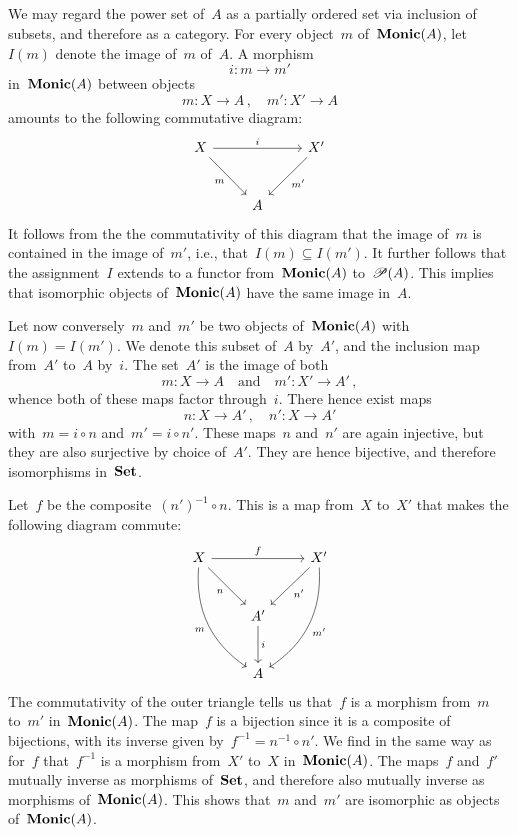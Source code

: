 \subsection{}



\subsubsection{}

We may regard the power set of~$A$ as a partially ordered set via inclusion of subsets, and therefore as a category.
For every object~$m$ of~$\mathbf{Monic}(A)$, let $I(m)$ denote the image of~$m$ of~$A$.
A morphism
\[
	i \colon m \to m'
\]
in~$\mathbf{Monic}(A)$ between objects
\[
	m \colon X \to A \,,
	\quad
	m' \colon X' \to A
\]
amounts to the following commutative diagram:
\[
	\begin{tikzcd}[row sep = large]
		X
		\arrow{rr}[above]{i}
		\arrow{dr}[below left]{m}
		&
		{}
		&
		X'
		\arrow{dl}[below right]{m'}
		\\
		{}
		&
		A
		&
		{}
	\end{tikzcd}
\]
It follows from the the commutativity of this diagram that the image of~$m$ is contained in the image of~$m'$, i.e., that~$I(m) ⊆ I(m')$.
It further follows that the assignment~$I$ extends to a functor from~$\mathbf{Monic}(A)$ to~$\mathscr{P}(A)$.
This implies that isomorphic objects of~$\mathbf{Monic}(A)$ have the same image in~$A$.

Let now conversely~$m$ and~$m'$ be two objects of~$\mathbf{Monic}(A)$ with~$I(m) = I(m')$.
We denote this subset of~$A$ by~$A'$, and the inclusion map from~$A'$ to~$A$ by~$i$.
The set~$A'$ is the image of both
\[
	m \colon X \to A
	\quad\text{and}\quad
	m' \colon X' \to A' \,,
\]
whence both of these maps factor through~$i$.
There hence exist maps
\[
	n \colon X \to A' \,,
	\quad
	n' \colon X \to A'
\]
with~$m = i ∘ n$ and~$m' = i ∘ n'$.
These maps~$n$ and~$n'$ are again injective, but they are also surjective by choice of~$A'$.
They are hence bijective, and therefore isomorphisms in~$\mathbf{Set}$.

Let~$f$ be the composite~$(n')^{-1} ∘ n$.
This is a map from~$X$ to~$X'$ that makes the following diagram commute:
\[
	\begin{tikzcd}[row sep = large]
		X
		\arrow{rr}[above]{f}
		\arrow{dr}[below left]{n}
		\arrow[bend right]{ddr}[below left]{m}
		&
		{}
		&
		X'
		\arrow{dl}[below right]{n'}
		\arrow[bend left]{ddl}[below right]{m'}
		\\
		{}
		&
		A'
		\arrow{d}[right]{i}
		&
		{}
		\\
		{}
		&
		A
		&
		{}
	\end{tikzcd}
\]
The commutativity of the outer triangle tells us that~$f$ is a morphism from~$m$ to~$m'$ in~$\mathbf{Monic}(A)$.
The map~$f$ is a bijection since it is a composite of bijections, with its inverse given by~$f^{-1} = n^{-1} ∘ n'$.
We find in the same way as for~$f$ that~$f^{-1}$ is a morphism from~$X'$ to~$X$ in~$\mathbf{Monic}(A)$.
The maps~$f$ and~$f'$ mutually inverse as morphisms of~$\mathbf{Set}$, and therefore also mutually inverse as morphisms of~$\mathbf{Monic}(A)$.
This shows that~$m$ and~$m'$ are isomorphic as objects of~$\mathbf{Monic}(A)$.


